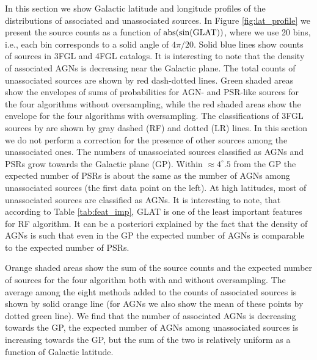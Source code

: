 In this section we show Galactic latitude and longitude profiles of the distributions of associated and unassociated sources.
In Figure \ref{fig:lat_profile} we present the source counts as a function of ${\rm abs(sin(GLAT))}$,
where we use 20 bins, i.e., each bin corresponds to a solid angle of $4 \pi / 20$. 
Solid blue lines show counts of sources in 3FGL and 4FGL catalogs.
It is interesting to note that the density of associated AGNs is decreasing near the Galactic plane.
The total counts of unassociated sources are shown by red dash-dotted lines.
Green shaded areas show the envelopes of sums of probabilities for AGN- and PSR-like sources for the four 
algorithms without oversampling, while the red shaded areas show the envelope for the four algorithms 
with oversampling.
The classifications of 3FGL sources by \cite{2016ApJ...820....8S} are shown by gray dashed (RF) and dotted (LR) lines.
In this section we do not perform a correction for the presence of other sources among the unassociated ones.
The numbers of unassociated sources classified as AGNs and PSRs grow towards the Galactic plane (GP).
Within $\approx 4^\circ\!\!.5$ from the GP the expected number of PSRs is about the same as the number of AGNs among unassociated sources (the first data point on the left).
At high latitudes, most of unassociated sources are classified as AGNs.
It is interesting to note, that according to Table \ref{tab:feat_imp}, GLAT is one of the least important features for RF algorithm.
It can be a posteriori explained by the fact that
 the density of AGNs is such that even in the GP the expected number of AGNs is comparable to the expected number of PSRs.

Orange shaded areas show the sum of the source counts and the expected number of sources for the four algorithm both with and without oversampling.
The average among the eight methods added to the counts of associated sources is shown by solid orange line 
(for AGNs we also show the mean of these points by dotted green line).
We find that the number of associated AGNs is decreasing towards the GP, the expected number of AGNs among unassociated sources is increasing towards the GP, but the sum of the two is relatively uniform as a function of Galactic latitude.


